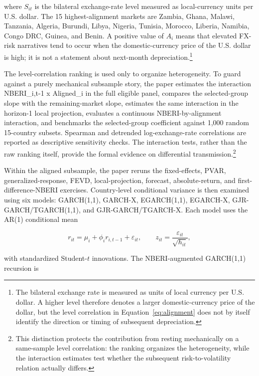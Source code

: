 \documentclass[11pt]{article}
\begin{document}
where $S_{it}$ is the bilateral exchange-rate level measured as local-currency units per U.S. dollar. The 15 highest-alignment markets are Zambia, Ghana, Malawi, Tanzania, Algeria, Burundi, Libya, Nigeria, Tunisia, Morocco, Liberia, Namibia, Congo DRC, Guinea, and Benin. A positive value of $A_i$ means that elevated FX-risk narratives tend to occur when the domestic-currency price of the U.S. dollar is high; it is not a statement about next-month depreciation.\footnote{The bilateral exchange rate is measured as units of local currency per U.S. dollar. A higher level therefore denotes a larger domestic-currency price of the dollar, but the level correlation in Equation~\eqref{eq:alignment} does not by itself identify the direction or timing of subsequent depreciation.}

The level-correlation ranking is used only to organize heterogeneity. To
guard against a purely mechanical subsample story, the paper estimates
the interaction NBERI\_i,t-1 x Aligned\_i in the full eligible panel,
compares the selected-group slope with the remaining-market slope,
estimates the same interaction in the horizon-1 local projection,
evaluates a continuous NBERI-by-alignment interaction, and benchmarks
the selected-group coefficient against 1,000 random 15-country subsets.
Spearman and detrended log-exchange-rate correlations are reported as
descriptive sensitivity checks. The interaction tests, rather than the
raw ranking itself, provide the formal evidence on differential
transmission.\footnote{This distinction protects the contribution from resting mechanically on a same-sample level correlation: the ranking organizes the heterogeneity, while the interaction estimates test whether the subsequent risk-to-volatility relation actually differs.}

Within the aligned subsample, the paper reruns the fixed-effects, PVAR, generalized-response, FEVD, local-projection, forecast, absolute-return, and first-difference-NBERI exercises. Country-level conditional variance is then examined using six models: GARCH(1,1), GARCH-X, EGARCH(1,1), EGARCH-X, GJR-GARCH/TGARCH(1,1), and GJR-GARCH/TGARCH-X. Each model uses the AR(1) conditional mean

\begin{equation}
\label{eq:garch-mean}
r_{it}=\mu_i+\phi_i r_{i,t-1}+\varepsilon_{it},
\qquad
z_{it}=\frac{\varepsilon_{it}}{\sqrt{h_{it}}},
\end{equation}

with standardized Student-$t$ innovations. The NBERI-augmented GARCH(1,1) recursion is
\end{document}
